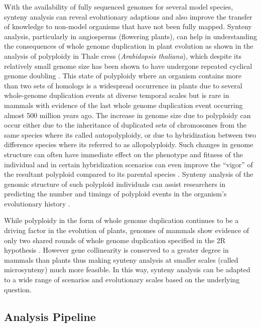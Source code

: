 With the availability of fully sequenced genomes for several model species, synteny analysis can reveal evolutionary adaptions and also improve the transfer of knowledge to non-model organisms that have not been fully mapped\cite{zhao2019network}. Synteny analysis, particularly in angiosperms (flowering plants), can help in understanding the consequences of whole genome duplication in plant evolution\cite{adams2005polyploidy} as shown in the analysis of polyploidy in Thale cress (\textit{Arabidopsis thaliana}), which despite its relatively small genome size has been shown to have undergone repeated cyclical genome doubling \cite{seoighe2004genome,seoighe2003turning}. This state of polyploidy where an organism contains more than two sets of homologs is a widespread occurrence in plants  due to several whole-genome duplication events at diverse temporal scales but is rare in mammals with evidence of the last whole genome duplication event occurring almost 500 million years ago\cite{adams2005polyploidy,panopoulou2005timing}. The increase in genome size due to polyploidy can occur either due to the inheritance of duplicated sets of chromosomes from the same species where its called autopolyploidy, or due to hybridization between two difference species where its referred to as allopolyploidy. Such changes in genome structure can often have immediate effect on the phenotype and fitness of the individual and in certain hybridization scenarios can even improve the ``vigor'' of the resultant polyploid compared to its parental species \cite{otto2007evolutionary}. Synteny analysis of the genomic structure of such polyploid individuals can assist researchers in predicting the number and timings of polyploid events in the organism's evolutionary history \cite{adams2005polyploidy}. 

While polyploidy in the form of whole genome duplication continues to be a driving factor in the evolution of plants, genomes of mammals show evidence of only two shared rounds of whole genome duplication specified in the 2R hypothesis \cite{hokamp20032r}. However gene collinearity is conserved to a greater degree in mammals than plants thus making synteny analysis at smaller scales (called microsynteny) much more feasible\cite{zhao2019network}. In this way, synteny analysis can be adapted to a wide range of scenarios and evolutionary scales based on the underlying question.


\subsection{Analysis Pipeline}

